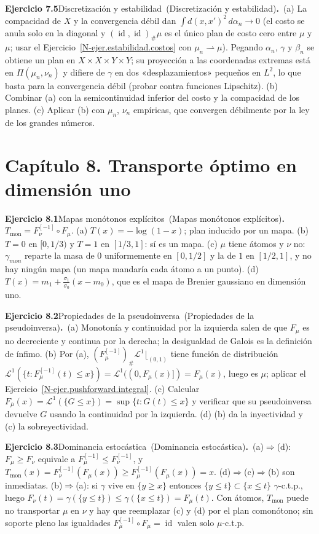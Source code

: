 \documentclass[11pt,a4paper]{amsart}
\newcommand{\id}{\operatorname{id}}
\newcommand{\LL}{{\mathcal L}}
\theoremstyle{remark}
\theoremstyle{definition}
\numberwithin{subsection}{section}
\numberwithin{equation}{section}
\newcommand{\ejlabel}[2]{\par\medskip\noindent\textbf{Ejercicio #1}\ifx\relax#2\relax\else\ (#2)\fi\textbf{.}\ }
\begin{document}
\ejlabel{7.5}{Discretización y estabilidad}(a) La compacidad de $X$ y la convergencia débil dan $\int d(x,x')^2\,d\alpha_n\to0$ (el costo se anula solo en la diagonal y $(\id,\id)_\#\mu$ es el único plan de costo cero entre $\mu$ y $\mu$; usar el Ejercicio~\ref{N-ejer.estabilidad.costos} con $\mu_n\rightharpoonup\mu$). Pegando $\alpha_n$, $\gamma$ y $\beta_n$ se obtiene un plan en $X\times X\times Y\times Y$; su proyección a las coordenadas extremas está en $\Pi(\mu_n,\nu_n)$ y difiere de $\gamma$ en dos «desplazamientos» pequeños en $L^2$, lo que basta para la convergencia débil (probar contra funciones Lipschitz). (b) Combinar (a) con la semicontinuidad inferior del costo y la compacidad de los planes. (c) Aplicar (b) con $\mu_n$, $\nu_n$ empíricas, que convergen débilmente por la ley de los grandes números.

\section*{Capítulo 8. Transporte óptimo en dimensión uno}
\ejlabel{8.1}{Mapas monótonos explícitos}$T_\text{mon}=F_\nu^{[-1]}\circ F_\mu$. (a) $T(x)=-\log(1-x)$; plan inducido por un mapa. (b) $T=0$ en $[0,1/3)$ y $T=1$ en $[1/3,1]$: sí es un mapa. (c) $\mu$ tiene átomos y $\nu$ no: $\gamma_{mon}$ reparte la masa de $0$ uniformemente en $[0,1/2]$ y la de $1$ en $[1/2,1]$, y no hay ningún mapa (un mapa mandaría cada átomo a un punto). (d) $T(x)=m_1+\frac{\sigma_1}{\sigma_0}(x-m_0)$, que es el mapa de Brenier gaussiano en dimensión uno.

\ejlabel{8.2}{Propiedades de la pseudoinversa}(a) Monotonía y continuidad por la izquierda salen de que $F_\mu$ es no decreciente y continua por la derecha; la desigualdad de Galois es la definición de ínfimo. (b) Por (a), $(F_\mu^{[-1]})_\#\LL^1\lfloor_{(0,1)}$ tiene función de distribución $\LL^1(\{t:F_\mu^{[-1]}(t)\le x\})=\LL^1((0,F_\mu(x)])=F_\mu(x)$, luego es $\mu$; aplicar el Ejercicio~\ref{N-ejer.pushforward.integral}. (c) Calcular $F_{\bar\mu}(x)=\LL^1(\{G\le x\})=\sup\{t:G(t)\le x\}$ y verificar que su pseudoinversa devuelve $G$ usando la continuidad por la izquierda. (d) (b) da la inyectividad y (c) la sobreyectividad.

\ejlabel{8.3}{Dominancia estocástica}(a)$\Rightarrow$(d): $F_\mu\ge F_\nu$ equivale a $F_\mu^{[-1]}\le F_\nu^{[-1]}$, y $T_\text{mon}(x)=F_\nu^{[-1]}(F_\mu(x))\ge F_\mu^{[-1]}(F_\mu(x))=x$. (d)$\Rightarrow$(c)$\Rightarrow$(b) son inmediatas. (b)$\Rightarrow$(a): si $\gamma$ vive en $\{y\ge x\}$ entonces $\{y\le t\}\subset\{x\le t\}$ $\gamma$-c.t.p., luego $F_\nu(t)=\gamma(\{y\le t\})\le\gamma(\{x\le t\})=F_\mu(t)$. Con átomos, $T_\text{mon}$ puede no transportar $\mu$ en $\nu$ y hay que reemplazar (c) y (d) por el plan comonótono; sin soporte pleno las igualdades $F_\mu^{[-1]}\circ F_\mu=\id$ valen solo $\mu$-c.t.p.
\end{document}
